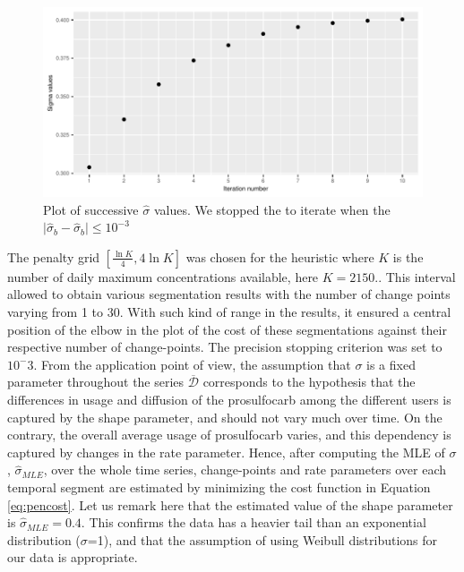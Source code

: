 \begin{figure}[ht]
  \centering
  \includegraphics[]{figs/Chap5/Sigma_heu.pdf}
  \caption{Plot of successive $\widehat{\sigma}$ values. We stopped the to iterate when the $\lvert \widehat{\sigma}_b - \widehat{\sigma}_{b} \rvert \leq 10^{-3}$}
  \label{fig:sig}
\end{figure}

The penalty grid $[\frac{\ln K}{4},4\ln K]$ was chosen for the heuristic where $K$ is the number of daily maximum concentrations available, here $K = 2150$.. This interval allowed to obtain various segmentation results with the number of change points varying from 1 to 30. With such kind of range in the results, it ensured a central position of the elbow in the plot of the cost of these segmentations against their respective number of change-points. The precision stopping criterion was set to $10^-3$.
From the application point of view, the assumption that $\sigma$ is a fixed parameter throughout the series $\overline{\mathcal{D}}$ corresponds to the hypothesis that the differences in usage and diffusion of the prosulfocarb among the different users is captured by the shape parameter, and should not vary much over time. On the contrary, the overall average usage of prosulfocarb varies, and this dependency is captured by changes in the rate parameter. Hence, after computing the MLE of $\sigma$, $\hat \sigma_{MLE}$, over the whole time series, change-points and rate parameters over each temporal segment are estimated by minimizing the cost function in Equation \ref{eq:pencost}. Let us remark here that the estimated value of the shape parameter is $\hat \sigma_{MLE}=0.4$. This confirms the data has a heavier tail than an exponential distribution ($\sigma$=1), and that the assumption of using Weibull distributions for our data is appropriate. 


